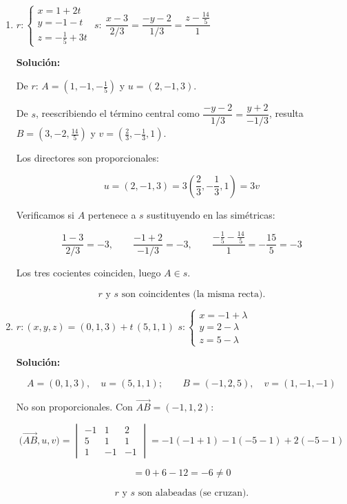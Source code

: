\documentclass[12pt]{article}
\newcommand{\solucion}{%
    \vspace{0.8em}%
    \textbf{Solución:}%
    \vspace{0.8em}%
}
\begin{document}
\begin{enumerate}[label=\alph*.-]
    \item $r:\begin{cases}
    x=1+2t\\
    y=-1-t\\
    z=-\tfrac{1}{5}+3t
    \end{cases}$
    \quad
    $s:\ \dfrac{x-3}{2/3}=\dfrac{-y-2}{1/3}=\dfrac{z-\tfrac{14}{5}}{1}$

    \solucion

    De $r$: $A=\left(1,-1,-\tfrac{1}{5}\right)$ y $u=(2,-1,3)$.

    De $s$, reescribiendo el término central como
    $\dfrac{-y-2}{1/3}=\dfrac{y+2}{-1/3}$, resulta
    $B=\left(3,-2,\tfrac{14}{5}\right)$ y
    $v=\left(\tfrac{2}{3},-\tfrac{1}{3},1\right)$.

    Los directores son proporcionales:

    \[
    u=(2,-1,3)=3\left(\frac{2}{3},-\frac{1}{3},1\right)=3v
    \]

    Verificamos si $A$ pertenece a $s$ sustituyendo en las simétricas:

    \[
    \frac{1-3}{2/3}=-3,\qquad
    \frac{-1+2}{-1/3}=-3,\qquad
    \frac{-\tfrac{1}{5}-\tfrac{14}{5}}{1}=-\frac{15}{5}=-3
    \]

    Los tres cocientes coinciden, luego $A\in s$.

    \[
    \boxed{r \text{ y } s \text{ son coincidentes (la misma recta).}}
    \]

    \item $r:(x,y,z)=(0,1,3)+t\,(5,1,1)$ \quad
    $s:\begin{cases}
    x=-1+\lambda\\
    y=2-\lambda\\
    z=5-\lambda
    \end{cases}$

    \solucion

    \[
    A=(0,1,3),\quad u=(5,1,1);\qquad B=(-1,2,5),\quad v=(1,-1,-1)
    \]

    No son proporcionales. Con $\overrightarrow{AB}=(-1,1,2)$:

    \[
    \big(\overrightarrow{AB},u,v\big)=\begin{vmatrix}
    -1 & 1 & 2\\
    5 & 1 & 1\\
    1 & -1 & -1
    \end{vmatrix}
    =-1(-1+1)-1(-5-1)+2(-5-1)
    \]

    \[
    =0+6-12=-6\neq0
    \]

    \[
    \boxed{r \text{ y } s \text{ son alabeadas (se cruzan).}}
    \]

\end{enumerate}
\end{document}
